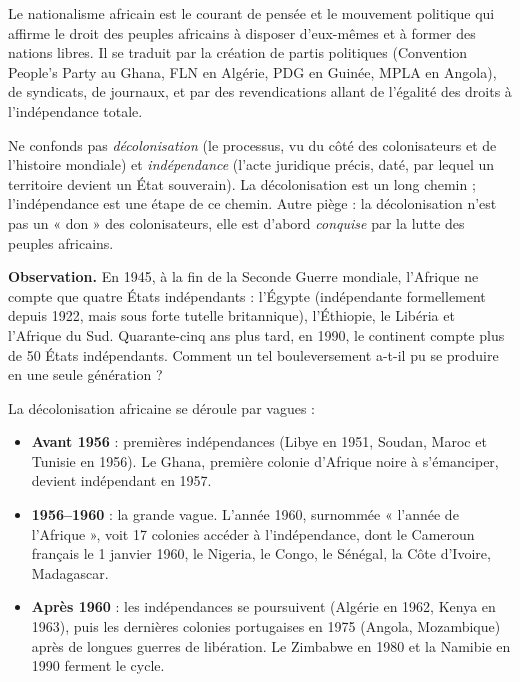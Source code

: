 \documentclass[11pt]{article}
\newcommand{\cle}[1]{{\popxbold\color{popdark}#1}}
\newcounter{popsec}
\newcounter{popsub}
\newcommand{\courssub}[1]{%
  \stepcounter{popsub}%
  \par\vspace{9pt}\noindent{\popxbold\fontsize{11.5}{13}\selectfont\color{popink}{\color{poporange}\thepopsec.\thepopsub}\hspace{6pt}#1}\par\nopagebreak\vspace{4pt}
}
\begin{document}
\begin{definition}
Le \cle{nationalisme africain} est le courant de pensée et le mouvement politique qui affirme le droit des peuples africains à disposer d'eux-mêmes et à former des nations libres. Il se traduit par la création de partis politiques (Convention People's Party au Ghana, FLN en Algérie, PDG en Guinée, MPLA en Angola), de syndicats, de journaux, et par des revendications allant de l'égalité des droits à l'indépendance totale.
\end{definition}

\begin{attention}
Ne confonds pas \emph{décolonisation} (le processus, vu du côté des colonisateurs et de l'histoire mondiale) et \emph{indépendance} (l'acte juridique précis, daté, par lequel un territoire devient un État souverain). La décolonisation est un long chemin ; l'indépendance est une étape de ce chemin. Autre piège : la décolonisation n'est pas un « don » des colonisateurs, elle est d'abord \emph{conquise} par la lutte des peuples africains.
\end{attention}

\courssub{Chronologie générale : de 1945 à 1990}

\textbf{Observation.} En 1945, à la fin de la Seconde Guerre mondiale, l'Afrique ne compte que quatre États indépendants : l'Égypte (indépendante formellement depuis 1922, mais sous forte tutelle britannique), l'Éthiopie, le Libéria et l'Afrique du Sud. Quarante-cinq ans plus tard, en 1990, le continent compte \cle{plus de 50 États indépendants}. Comment un tel bouleversement a-t-il pu se produire en une seule génération ?

La décolonisation africaine se déroule par vagues :
\begin{itemize}
\item \textbf{Avant 1956} : premières indépendances (Libye en 1951, Soudan, Maroc et Tunisie en 1956). Le Ghana, première colonie d'Afrique noire à s'émanciper, devient indépendant en 1957.
\item \textbf{1956--1960} : la grande vague. L'année \cle{1960}, surnommée « l'année de l'Afrique », voit 17 colonies accéder à l'indépendance, dont le Cameroun français le 1\ier{} janvier 1960, le Nigeria, le Congo, le Sénégal, la Côte d'Ivoire, Madagascar.
\item \textbf{Après 1960} : les indépendances se poursuivent (Algérie en 1962, Kenya en 1963), puis les dernières colonies portugaises en 1975 (Angola, Mozambique) après de longues guerres de libération. Le Zimbabwe en 1980 et la Namibie en 1990 ferment le cycle.
\end{itemize}
\end{document}
